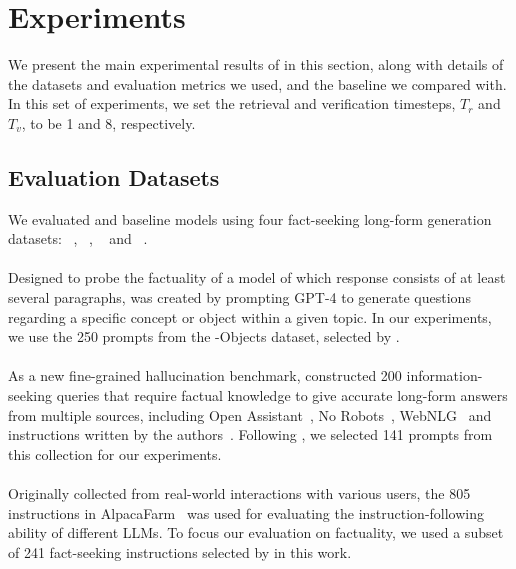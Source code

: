 \section{Experiments}
\label{sec:exp}

We present the main experimental results of \model in this section, along with details of the datasets and evaluation metrics we used, and the baseline we compared with. In this set of experiments, we set the retrieval and verification timesteps, $T_r$ and $T_v$, to be 1 and 8, respectively.

\subsection{Evaluation Datasets}
We evaluated \model and baseline models using four fact-seeking long-form generation datasets: \lf~\citep{wei2024longform}, \fava~\citep{mishra2024finegrained}, \alpaca~\citep{dubois2023alpacafarm,lin2024flame} and \bio~\citep{min-etal-2023-factscore}.

\paragraph{\lf} Designed to probe the factuality of a model of which response consists of at least several paragraphs, \lf was created by prompting GPT-4 to generate questions regarding a specific concept or object within a given topic.
In our experiments, we use the 250 prompts from the \lf-Objects dataset, selected by \citet{wei2024longform}.  
\paragraph{\fava} As a new fine-grained hallucination benchmark, \fava constructed 200 information-seeking queries that require factual knowledge to give accurate long-form answers from multiple sources, including Open Assistant~\citep{Kopf:OpenAssistant23}, No Robots~\citep{no_robots}, WebNLG~\citep{webnlg} and instructions written by the authors~\citep{mishra2024finegrained}. Following \citet{lin2024flame}, we selected 141 prompts from this collection for our experiments.
\paragraph{\alpaca} Originally collected from real-world interactions with various users, the 805 instructions in AlpacaFarm~\citep{dubois2023alpacafarm} was used for evaluating the instruction-following ability of different LLMs.
To focus our evaluation on factuality, we used a subset of 241 fact-seeking instructions selected by \citet{lin2024flame} in this work.
